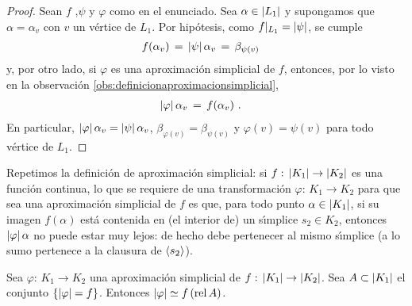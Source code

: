 \begin{proof}
	Sean $f$ ,$\psi$ y $\varphi$ como en el enunciado. Sea
	$\alpha\in\left|L_{1}\right|$ y supongamos que $\alpha=\alpha_{v}$ con
	$v$ un v\'{e}rtice de $L_{1}$. Por hip\'{o}tesis, como
	$f|_{L_{1}}=\left|\psi\right|$, se cumple
	\begin{align*}
		f(\alpha_{v}) & \,=\,\left|\psi\right|\alpha_{v}\,=\,\beta_{\psi(v)}
	\end{align*}
	y, por otro lado, si $\varphi$ es una aproximaci\'{o}n simplicial de
	$f$, entonces, por lo visto en la observaci\'{o}n
	\ref{obs:definicionaproximacionsimplicial},
	\begin{align*}
		\left|\varphi\right|\alpha_{v} & \,=\,f(\alpha_{v})
		\text{ .}
	\end{align*}
	En particular, $\left|\varphi\right|\alpha_{v}=\left|\psi\right|\alpha_{v}$,
	$\beta_{\varphi(v)}=\beta_{\psi(v)}$ y $\varphi(v)=\psi(v)$ para
	todo v\'{e}rtice de $L_{1}$.
\end{proof}

Repetimos la definici\'{o}n de aproximaci\'{o}n simplicial: si
$f:\,\left|K_{1}\right|\rightarrow\left|K_{2}\right|$ es una funci\'{o}n continua, lo que
se requiere de una transformaci\'{o}n $\varphi:\,K_{1}\rightarrow K_{2}$
para que sea una aproximaci\'{o}n simplicial de $f$ es que, para todo
punto $\alpha\in\left|K_{1}\right|$, si su imagen $f(\alpha)$ est\'{a} contenida
en (el interior de) un s\'{\i}mplice $s_{2}\in K_{2}$, entonces
$\left|\varphi\right|\alpha$ no puede estar muy lejos: de hecho debe pertenecer
al mismo s\'{\i}mplice (a lo sumo pertenece a la clausura de
$\langle s_{2}\rangle$).

\begin{lemaAproximacionEsHomotopica}\label{thm:aproximacioneshomotopica}
	Sea $\varphi:\,K_{1}\rightarrow K_{2}$ una aproximaci\'{o}n
	simplicial de $f:\,\left|K_{1}\right|\rightarrow\left|K_{2}\right|$. Sea
	$A\subset\left|K_{1}\right|$ el conjunto $\{\left|\varphi\right|=f\}$. Entonces
	$\left|\varphi\right|\simeq f\,(\mathrm{rel}\,A)$.
\end{lemaAproximacionEsHomotopica}

